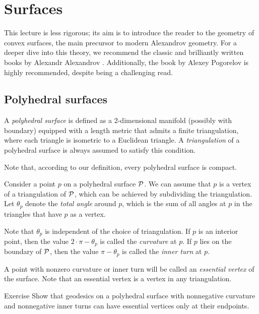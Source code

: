 \chapter{Surfaces}\label{chap:surfaces}

This lecture is less rigorous;
its aim is to introduce the reader to the geometry of convex surfaces, the main precursor to modern Alexandrov geometry.
For a deeper dive into this theory, we recommend the classic and brilliantly written books by Alexandr Alexandrov \cite{alexandrov, alexandrov-1948}.
Additionally, the book by Alexey Pogorelov \cite{pogorelov1969} is highly recommended, despite being a challenging read.


\section{Polyhedral surfaces}

A \emph{polyhedral surface} is defined as a 2-dimensional manifold (possibly with boundary) equipped with a length metric that admits a finite triangulation, where each triangle is isometric to a Euclidean triangle.
A \emph{triangulation} of a polyhedral surface is always assumed to satisfy this condition.

Note that, according to our definition, every polyhedral surface is compact.

Consider a point $p$ on a polyhedral surface $\mathcal{P}$.
We can assume that $p$ is a vertex of a triangulation of $\mathcal{P}$,
which can be achieved by subdividing the triangulation.
Let $\theta_p$ denote the \emph{total angle} around $p$, which is the sum of all angles at $p$ in the triangles that have $p$ as a vertex.

Note that $\theta_p$ is independent of the choice of triangulation.
If $p$ is an interior point, then the value $2\cdot\pi-\theta_p$ is called the \emph{curvature} at $p$.
If $p$ lies on the boundary of $\mathcal{P}$, then the value $\pi-\theta_p$ is called the \emph{inner turn} at $p$.

A point with nonzero curvature or inner turn will be called an \emph{essential vertex} of the surface.
Note that an essential vertex is a vertex in any triangulation.

\begin{thm}{Exercise}\label{ex:geodesic-vertex}
Show that geodesics on a polyhedral surface with nonnegative curvature and nonnegative inner turns can have essential vertices only at their endpoints.
\end{thm}

